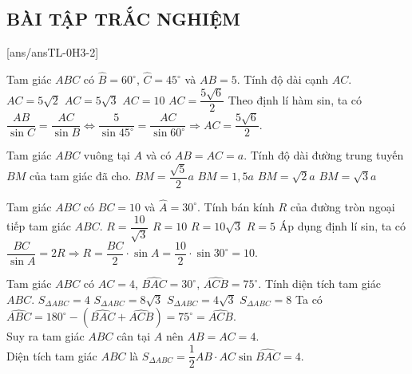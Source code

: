 \subsection{BÀI TẬP TRẮC NGHIỆM}
[ans/ansTL-0H3-2]
\setcounter{ex}{0}

\begin{ex}%
	Tam giác $ ABC$ có $ \widehat{B}=60^\circ$, $\widehat{C}=45^\circ $ và $ AB=5$. Tính độ dài cạnh $ AC$.
	\choice
	{$ AC=5\sqrt{2}$}
	{$ AC=5\sqrt{3}$}
	{$ AC=10$}
	{\True $ AC=\dfrac{5\sqrt{6}}{2}$}
	\loigiai
	{Theo định lí hàm sin, ta có $ \dfrac{AB}{\sin C}=\dfrac{AC}{\sin B}\Leftrightarrow \dfrac{5}{\sin 45^\circ}=\dfrac{AC}{\sin 60^\circ}\Rightarrow AC=\dfrac{5\sqrt{6}}{2}$.}
\end{ex}

\begin{ex}%
	Tam giác $ ABC$ vuông tại $ A$ và có $ AB=AC=a$. Tính độ dài đường trung tuyến $ BM$ của tam giác đã cho.
	\choice
	{\True $ BM=\dfrac{\sqrt{5}}{2}a$}
	{$ BM=1{,}5a$}
	{$ BM=\sqrt{2}a$}
	{$ BM=\sqrt{3}a$}
\end{ex}


\begin{ex}%
	Tam giác $ ABC$ có $ BC=10$ và $ \widehat{A}=30^\circ$. Tính bán kính $ R$ của đường tròn ngoại tiếp tam giác $ ABC$.
	\choice
	{$ R=\dfrac{10}{\sqrt{3}}$}
	{\True $ R=10$}
	{$ R=10\sqrt{3}$}
	{$ R=5$}
	\loigiai
	{Áp dụng định lí sin, ta có $ \dfrac{BC}{\sin A}=2R\Rightarrow R=\dfrac{BC}{2}\cdot \sin  A=\dfrac{10}{2}\cdot \sin 30^\circ=10$.}
\end{ex}


\begin{ex}%
	Tam giác $ ABC$ có $ AC=4$, $\widehat{BAC}=30^\circ$, $\widehat{ACB}=75^\circ $. Tính diện tích tam giác $ ABC$.
	\choice
	{\True $ S_{\Delta ABC}=4$}
	{$ S_{\Delta ABC}=8\sqrt{3}$}
	{$ S_{\Delta ABC}=4\sqrt{3}$}
	{$ S_{\Delta ABC}=8$}
	\loigiai
	{Ta có $ \widehat{ABC}=180^\circ-(\widehat{BAC}+\widehat{ACB} )=75^\circ =\widehat{ACB}$.\\
		Suy ra tam giác $ ABC$ cân tại $ A$ nên $ AB=AC=4$.\\
		Diện tích tam giác $ ABC$ là $ S_{\Delta ABC}=\dfrac{1}{2}AB\cdot AC\sin \widehat{BAC}=4$.}
\end{ex}


